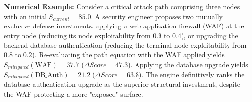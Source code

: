 \textbf{Numerical Example:} Consider a critical attack path comprising three nodes with an initial $S_{current} = 85.0$. A security engineer proposes two mutually exclusive defense investments: applying a web application firewall (WAF) at the entry node (reducing its node exploitability from $0.9$ to $0.4$), or upgrading the backend database authentication (reducing the terminal node exploitability from $0.8$ to $0.2$). Re-evaluating the path equation with the WAF applied yields $S_{mitigated}(\text{WAF}) = 37.7$ ($\Delta Score = 47.3$). Applying the database upgrade yields $S_{mitigated}(\text{DB\_Auth}) = 21.2$ ($\Delta Score = 63.8$). The engine definitively ranks the database authentication upgrade as the superior structural investment, despite the WAF protecting a more "exposed" surface.
